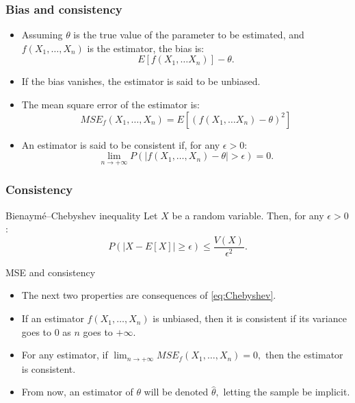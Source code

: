 \documentclass[main.tex]{subfiles}
\begin{document}
\begin{frame}
    \frametitle{Bias and consistency}
\begin{itemize}
\item<+-> Assuming $\theta$ is the true value of the parameter to be estimated,
and $f\left( X_1, \dots, X_n \right)$ is the estimator, the bias is:
\begin{equation}
    E\left[ f\left( X_1,\dots X_n \right) \right] - \theta.
\end{equation}
\item<+-> If the bias vanishes, the estimator is said to be unbiased.
\item<+-> The mean square error of the estimator is:
\begin{equation}
    MSE_f(X_1,\dots, X_n)= E\left[ \left( f(X_1, \dots X_n) - \theta \right)^2 \right]
\end{equation}
\item<+-> An estimator is said to be consistent if, for any $\epsilon > 0$:
\begin{equation}
    \lim_{n \to +\infty}P\left( \lvert f(X_1,\dots,X_n) - \theta\rvert > \epsilon \right) = 0.
\end{equation} 
\end{itemize}
\end{frame}
\begin{frame}
    \frametitle{Consistency}
    \begin{block}{Bienaymé–Chebyshev inequality}
        Let $X$ be a random variable. Then, for any
        $\epsilon > 0$:
        \begin{equation}
            \label{eq:Chebyshev}
            P\left( \lvert X- E\left[ X \right] \rvert \geq \epsilon \right) \leq \frac{V(X)}{\epsilon^2}.
        \end{equation}
    \end{block}
    \begin{block}{MSE and consistency}
        \begin{itemize}
            \item<+-> The next two properties are consequences of \ref{eq:Chebyshev}.
            \item<+-> If an estimator $f\left( X_1, \dots, X_n \right)$ is unbiased, then it is consistent
    if its variance goes to 0 as $n$ goes to $+\infty$.
            \item<+-> For any estimator, if $\lim_{n \to +\infty} MSE_f\left( X_1,\dots,X_n \right) = 0,$ then
            the estimator is consistent.
            \item<+-> From now, an estimator of $\theta$ will be denoted $\hat{\theta},$ letting the sample be implicit.
        \end{itemize}
    \end{block}
\end{frame}
\end{document}
